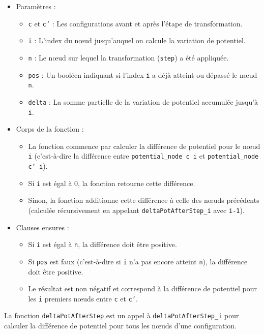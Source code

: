 \documentclass[11pt]{article}
\begin{document}
\begin{itemize}
\item Paramètres :
\begin{itemize}
\item \texttt{c} et \texttt{c'} : Les configurations avant et après l'étape de transformation.
\item \texttt{i} : L'index du nœud jusqu'auquel on calcule la variation de potentiel.
\item \texttt{n} : Le nœud sur lequel la transformation (\texttt{step}) a été appliquée.
\item \texttt{pos} : Un booléen indiquant si l'index \texttt{i} a déjà atteint ou dépassé le nœud \texttt{n}.
\item \texttt{delta} : La somme partielle de la variation de potentiel accumulée jusqu'à \texttt{i}.
\end{itemize}

\item Corps de la fonction :
\begin{itemize}
\item La fonction commence par calculer la différence de potentiel pour le nœud \texttt{i} (c'est-à-dire la différence entre \texttt{potential\_node c i} et \texttt{potential\_node c' i}).
\item Si \texttt{i} est égal à 0, la fonction retourne cette différence.
\item Sinon, la fonction additionne cette différence à celle des nœuds précédents (calculée récursivement en appelant \texttt{deltaPotAfterStep\_i} avec \texttt{i-1}).
\end{itemize}

\item Clauses ensures :
\begin{itemize}
\item Si \texttt{i} est égal à \texttt{n}, la différence doit être positive.
\item Si \texttt{pos} est faux (c'est-à-dire si \texttt{i} n'a pas encore atteint \texttt{n}), la différence doit être positive.
\item Le résultat est non négatif et correspond à la différence de potentiel pour les \texttt{i} premiers nœuds entre \texttt{c} et \texttt{c'}.
\end{itemize}
\end{itemize}

La fonction \texttt{deltaPotAfterStep} est un appel à \texttt{deltaPotAfterStep\_i} pour calculer la différence de potentiel pour tous les nœuds d'une configuration.
\end{document}
